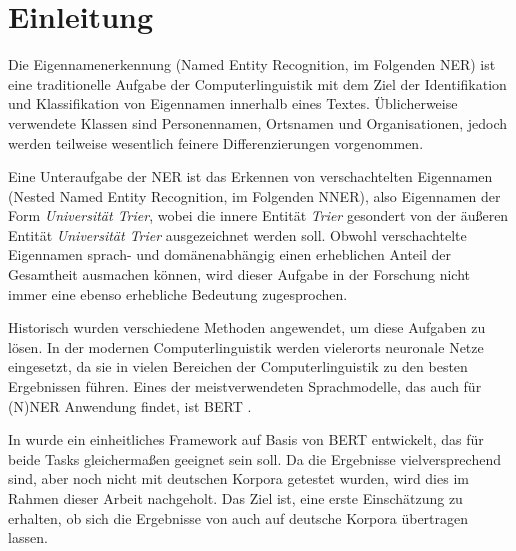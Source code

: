 

\chapter{Einleitung}
\label{ch:Einleitung}

Die Eigennamenerkennung (Named Entity Recognition, im Folgenden NER) ist eine traditionelle Aufgabe der Computerlinguistik mit dem Ziel der Identifikation und Klassifikation von Eigennamen innerhalb eines Textes. Üblicherweise verwendete Klassen sind Personennamen, Ortsnamen und Organisationen, jedoch werden teilweise wesentlich feinere Differenzierungen vorgenommen.

Eine Unteraufgabe der NER ist das Erkennen von verschachtelten Eigennamen (Nested Named Entity Recognition, im Folgenden NNER), also Eigennamen der Form \emph{Universität Trier}, wobei die innere Entität \emph{Trier} gesondert von der äußeren Entität \emph{Universität Trier} ausgezeichnet werden soll. Obwohl verschachtelte Eigennamen sprach- und domänenabhängig einen erheblichen Anteil der Gesamtheit ausmachen können, wird dieser Aufgabe in der Forschung nicht immer eine ebenso erhebliche Bedeutung zugesprochen.

Historisch wurden verschiedene Methoden angewendet, um diese Aufgaben zu lösen. In der modernen Computerlinguistik werden vielerorts neuronale Netze eingesetzt, da sie in vielen Bereichen der Computerlinguistik zu den besten Ergebnissen führen. Eines der meistverwendeten Sprachmodelle, das auch für (N)NER Anwendung findet, ist BERT \parencite{devlin2019bert}.

In \cite{li2019unified} wurde ein einheitliches Framework auf Basis von BERT entwickelt, das für beide Tasks gleichermaßen geeignet sein soll. Da die Ergebnisse vielversprechend sind, aber noch nicht mit deutschen Korpora getestet wurden, wird dies im Rahmen dieser Arbeit nachgeholt. Das Ziel ist, eine erste Einschätzung zu erhalten, ob sich die Ergebnisse von  auch auf deutsche Korpora übertragen lassen.

